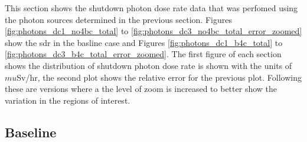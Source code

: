 \documentclass[12pt]{article}
\begin{document}
This section shows the shutdown photon dose rate data that was perfomed using
the photon sources determined in the previous section. Figures \ref{fig:photons_dc1_no4bc_total}
to \ref{fig:photons_dc3_no4bc_total_error_zoomed} show the \gls{sdr} in the basline case 
and Figures \ref{fig:photons_dc1_b4c_total} to \ref{fig:photons_dc3_b4c_total_error_zoomed}. 
The first figure of each section shows the distribution of shutdown photon dose rate is shown 
with the units of $mu$Sv/hr, the second plot shows the relative error for the previous plot. Following
these are versions where a the level of zoom is increased to better show the variation in the regions
of interest.

\subsection{Baseline}
\end{document}
